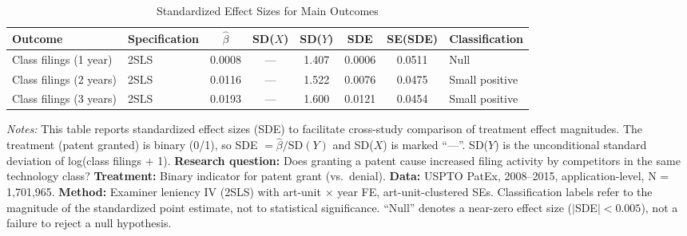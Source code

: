 \begin{table}[H]
\centering
\caption{Standardized Effect Sizes for Main Outcomes}
\label{tab:sde}
\begin{adjustbox}{max width=\textwidth}
\begin{tabular}{llcccccl}
\toprule
Outcome & Specification & $\hat{\beta}$ & SD($X$) & SD($Y$) & SDE & SE(SDE) & Classification \\
\midrule
Class filings (1 year) & 2SLS & 0.0008 & --- & 1.407 & 0.0006 & 0.0511 & Null \\
Class filings (2 years) & 2SLS & 0.0116 & --- & 1.522 & 0.0076 & 0.0475 & Small positive \\
Class filings (3 years) & 2SLS & 0.0193 & --- & 1.600 & 0.0121 & 0.0454 & Small positive \\
\bottomrule
\end{tabular}
\end{adjustbox}
\par\vspace{0.3em}
{\footnotesize \emph{Notes:} This table reports standardized effect sizes (SDE) to facilitate cross-study comparison of treatment effect magnitudes. The treatment (patent granted) is binary (0/1), so SDE $= \hat{\beta} / \text{SD}(Y)$ and SD($X$) is marked ``---''. SD($Y$) is the unconditional standard deviation of log(class filings + 1). \textbf{Research question:} Does granting a patent cause increased filing activity by competitors in the same technology class? \textbf{Treatment:} Binary indicator for patent grant (vs.\ denial). \textbf{Data:} USPTO PatEx, 2008--2015, application-level, N = 1,701,965. \textbf{Method:} Examiner leniency IV (2SLS) with art-unit $\times$ year FE, art-unit-clustered SEs. Classification labels refer to the magnitude of the standardized point estimate, not to statistical significance. ``Null'' denotes a near-zero effect size ($|$SDE$| < 0.005$), not a failure to reject a null hypothesis.}
\end{table}

